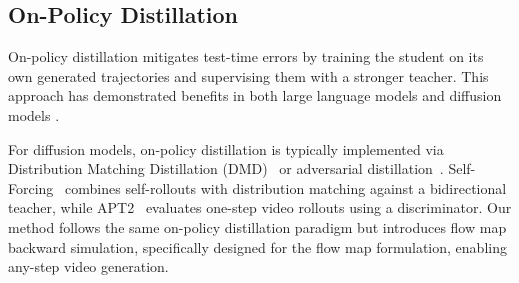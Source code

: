 \subsection{On-Policy Distillation}
On-policy distillation mitigates test-time errors  by training the student on its own generated trajectories and supervising them with a stronger teacher. This approach has demonstrated benefits in both large language models \cite{lu2025onpolicy, zhao2026self, ye2026policy} and diffusion models \cite{yin2024one, huang2025selfforcing, yin2024improved}.

For diffusion models, on-policy distillation is typically implemented via Distribution Matching Distillation (DMD)~\cite{yin2024one, yin2024improved} or adversarial distillation~\cite{lindiffusion, lin2025autoregressive}. Self-Forcing~\cite{huang2025selfforcing} combines self-rollouts with distribution matching against a bidirectional teacher, while APT2~\cite{lin2025autoregressive} evaluates one-step video rollouts using a discriminator. Our method follows the same on-policy distillation paradigm but introduces flow map backward simulation, specifically designed for the flow map formulation, enabling any-step video generation.